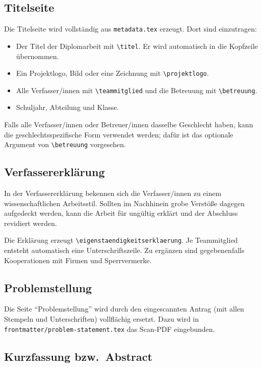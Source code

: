 \subsection{Titelseite}

Die Titelseite wird vollständig aus \lstinline|metadata.tex| erzeugt. Dort
sind einzutragen:

\begin{itemize}
  \item Der Titel der Diplomarbeit mit \lstinline|\titel|. Er wird
        automatisch in die Kopfzeile übernommen.
  \item Ein Projektlogo, Bild oder eine Zeichnung mit
        \lstinline|\projektlogo|.
  \item Alle Verfasser/innen mit \lstinline|\teammitglied| und die
        Betreuung mit \lstinline|\betreuung|.
  \item Schuljahr, Abteilung und Klasse.
\end{itemize}

Falls alle Verfasser/innen oder Betreuer/innen dasselbe Geschlecht haben,
kann die geschlechtsspezifische Form verwendet werden; dafür ist das
optionale Argument von \lstinline|\betreuung| vorgesehen.

\subsection{Verfassererklärung}

In der Verfassererklärung bekennen sich die Verfasser/innen zu einem
wissenschaftlichen Arbeitsstil. Sollten im Nachhinein grobe Verstöße dagegen
aufgedeckt werden, kann die Arbeit für ungültig erklärt und der Abschluss
revidiert werden.

Die Erklärung erzeugt \lstinline|\eigenstaendigkeitserklaerung|. Je
Teammitglied entsteht automatisch eine Unterschriftszeile. Zu ergänzen sind
gegebenenfalls Kooperationen mit Firmen und Sperrvermerke.

\subsection{Problemstellung}

Die Seite \enquote{Problemstellung} wird durch den eingescannten Antrag (mit
allen Stempeln und Unterschriften) vollflächig ersetzt. Dazu wird in
\lstinline|frontmatter/problem-statement.tex| das Scan-PDF eingebunden.

\subsection{Kurzfassung bzw.\ Abstract}

